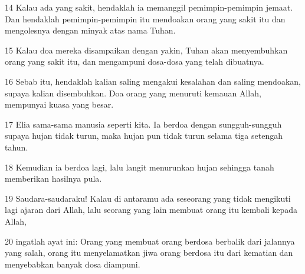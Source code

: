\par 14 Kalau ada yang sakit, hendaklah ia memanggil pemimpin-pemimpin jemaat. Dan hendaklah pemimpin-pemimpin itu mendoakan orang yang sakit itu dan mengolesnya dengan minyak atas nama Tuhan.
\par 15 Kalau doa mereka disampaikan dengan yakin, Tuhan akan menyembuhkan orang yang sakit itu, dan mengampuni dosa-dosa yang telah dibuatnya.
\par 16 Sebab itu, hendaklah kalian saling mengakui kesalahan dan saling mendoakan, supaya kalian disembuhkan. Doa orang yang menuruti kemauan Allah, mempunyai kuasa yang besar.
\par 17 Elia sama-sama manusia seperti kita. Ia berdoa dengan sungguh-sungguh supaya hujan tidak turun, maka hujan pun tidak turun selama tiga setengah tahun.
\par 18 Kemudian ia berdoa lagi, lalu langit menurunkan hujan sehingga tanah memberikan hasilnya pula.
\par 19 Saudara-saudaraku! Kalau di antaramu ada seseorang yang tidak mengikuti lagi ajaran dari Allah, lalu seorang yang lain membuat orang itu kembali kepada Allah,
\par 20 ingatlah ayat ini: Orang yang membuat orang berdosa berbalik dari jalannya yang salah, orang itu menyelamatkan jiwa orang berdosa itu dari kematian dan menyebabkan banyak dosa diampuni.


